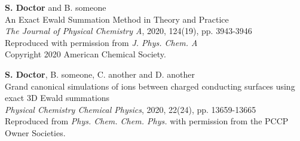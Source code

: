 


\cleardoublepage
{} %
\thispagestyle{empty}
\vspace*{20mm} %
\begin{minipage}{8cm}

\end{minipage}%
\hfill{ 
\fontsize{20}{30}\selectfont {\bf Paper~\I}}\marginpar{\rule[-4mm]{50mm}{14mm}} %
\vfill
\textbf{S. Doctor} and B. someone\\
An Exact Ewald Summation Method in Theory and Practice\\
\textit{The Journal of Physical Chemistry A}, 2020, 124(19), pp. 3943-3946\\
Reproduced with permission from \textit{J. Phys. Chem. A}\\
Copyright 2020 American Chemical Society.

\cleardoublepage





\cleardoublepage
{} %
\thispagestyle{empty}
\vspace*{34mm} %
\begin{minipage}{8cm}
\end{minipage}%
\hfill{ 
\fontsize{20}{30}\selectfont {\bf Paper~\II}}\marginpar{\rule[-4mm]{50mm}{14mm}} %
\vfill
\textbf{S. Doctor}, B. someone, C. another and D. another\\
Grand canonical simulations of ions between charged conducting surfaces using exact 3D Ewald summations\\
\textit{Physical Chemistry Chemical Physics}, 2020, 22(24), pp. 13659-13665\\
Reproduced from \textit{Phys. Chem. Chem. Phys.} with permission from the PCCP Owner Societies.

